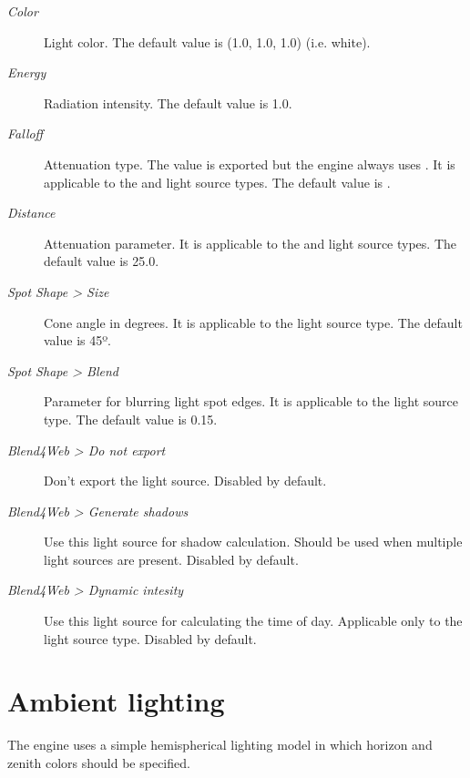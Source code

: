 \documentclass[a4paper,12pt,oneside]{sphinxmanual}
\begin{document}
\begin{DUlineblock}{0em}
\item[] 
\end{DUlineblock}
\begin{description}
\item[{\emph{Color}}] \leavevmode
Light color. The default value is (1.0, 1.0, 1.0) (i.e. white).

\item[{\emph{Energy}}] \leavevmode
Radiation intensity. The default value is 1.0.

\item[{\emph{Falloff}}] \leavevmode
Attenuation type. The value is exported but the engine always uses . It is applicable to the  and  light source types. The default value is .

\item[{\emph{Distance}}] \leavevmode
Attenuation parameter. It is applicable to the  and  light source types. The default value is 25.0.

\item[{\emph{Spot Shape \textgreater{} Size}}] \leavevmode
Cone angle in degrees. It is applicable to the  light source type. The default value is 45º.

\item[{\emph{Spot Shape \textgreater{} Blend}}] \leavevmode
Parameter for blurring light spot edges. It is applicable to the  light source type. The default value is 0.15.

\item[{\emph{Blend4Web \textgreater{} Do not export}}] \leavevmode
Don't export the light source. Disabled by default.

\item[{\emph{Blend4Web \textgreater{} Generate shadows}}] \leavevmode
Use this light source for shadow calculation. Should be used when multiple light sources are present. Disabled by default.

\item[{\emph{Blend4Web \textgreater{} Dynamic intesity}}] \leavevmode
Use this light source for calculating the time of day. Applicable only to the  light source type. Disabled by default.

\end{description}


\section{Ambient lighting}
\label{lighting:id5}
The engine uses a simple hemispherical lighting model in which horizon and zenith colors should be specified.
\end{document}
